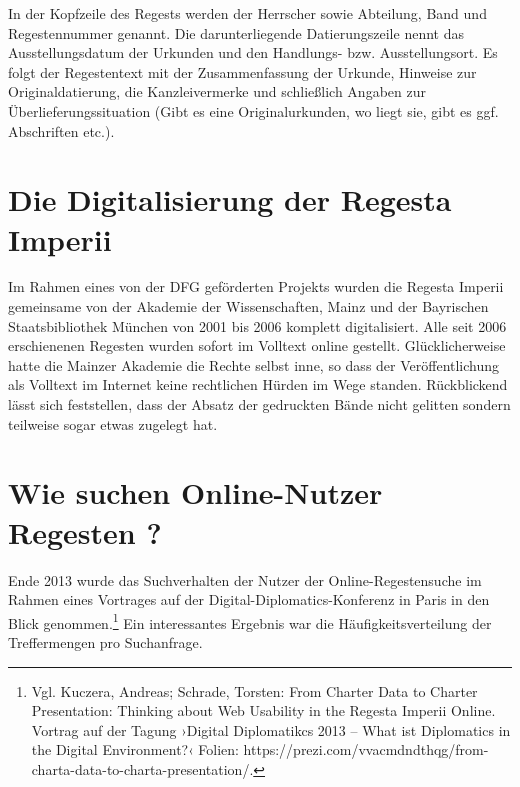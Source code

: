 \documentclass[ngerman,]{scrreprt}
\begin{document}
In der Kopfzeile des Regests werden der Herrscher sowie Abteilung, Band und Regestennummer genannt. Die darunterliegende Datierungszeile nennt das Ausstellungsdatum der Urkunden und den Handlungs- bzw. Ausstellungsort. Es folgt der Regestentext mit der Zusammenfassung der Urkunde, Hinweise zur Originaldatierung, die Kanzleivermerke und schließlich Angaben zur Überlieferungssituation (Gibt es eine Originalurkunden, wo liegt sie, gibt es ggf. Abschriften etc.).

\section{Die Digitalisierung der Regesta Imperii}\label{die-digitalisierung-der-regesta-imperii}

Im Rahmen eines von der DFG geförderten Projekts wurden die Regesta Imperii gemeinsame von der Akademie der Wissenschaften, Mainz und der Bayrischen Staatsbibliothek München von 2001 bis 2006 komplett digitalisiert. Alle seit 2006 erschienenen Regesten wurden sofort im Volltext online gestellt. Glücklicherweise hatte die Mainzer Akademie die Rechte selbst inne, so dass der Veröffentlichung als Volltext im Internet keine rechtlichen Hürden im Wege standen. Rückblickend lässt sich feststellen, dass der Absatz der gedruckten Bände nicht gelitten sondern teilweise sogar etwas zugelegt hat.

\section{Wie suchen Online-Nutzer Regesten ?}\label{wie-suchen-online-nutzer-regesten}

Ende 2013 wurde das Suchverhalten der Nutzer der Online-Regestensuche im Rahmen eines Vortrages auf der Digital-Diplomatics-Konferenz in Paris in den Blick genommen.\footnote{Vgl. Kuczera, Andreas; Schrade, Torsten: From Charter Data to Charter Presentation: Thinking about Web Usability in the Regesta Imperii Online. Vortrag auf der Tagung ›Digital Diplomatikcs 2013 -- What ist Diplomatics in the Digital Environment?‹ Folien: https://prezi.com/vvacmdndthqg/from-charta-data-to-charta-presentation/.} Ein interessantes Ergebnis war die Häufigkeitsverteilung der Treffermengen pro Suchanfrage.
\end{document}
